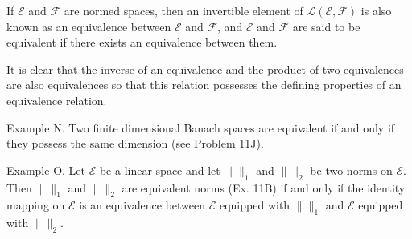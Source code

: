If $\mathcal{E}$ and $\mathcal{F}$ are normed spaces, then an invertible element of $\mathcal{L}(\mathcal{E}, \mathcal{F})$ is also known as an equivalence between $\mathcal{E}$ and $\mathcal{F}$, and $\mathcal{E}$ and $\mathcal{F}$ are said to be equivalent if there exists an equivalence between them.

It is clear that the inverse of an equivalence and the product of two equivalences are also equivalences so that this relation possesses the defining properties of an equivalence relation.

Example N. Two finite dimensional Banach spaces are equivalent if and only if they possess the same dimension (see Problem 11J).

Example O. Let $\mathcal{E}$ be a linear space and let $\|\|_1$ and $\|\|_2$ be two norms on $\mathcal{E}$. Then $\|\|_1$ and $\|\|_2$ are equivalent norms (Ex. 11B) if and only if the identity mapping on $\mathcal{E}$ is an equivalence between $\mathcal{E}$ equipped with $\|\|_1$ and $\mathcal{E}$ equipped with $\|\|_2$.
